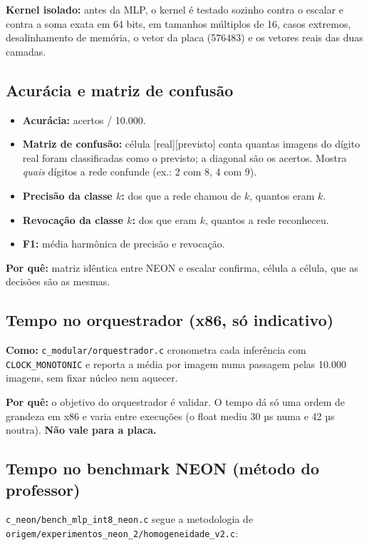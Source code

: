 \documentclass[10pt]{article}
\begin{document}
\textbf{Kernel isolado:} antes da MLP, o kernel é testado sozinho contra o escalar e contra a soma
exata em 64 bits, em tamanhos múltiplos de 16, casos extremos, desalinhamento de memória, o vetor
da placa (576483) e os vetores reais das duas camadas.

\subsection{Acurácia e matriz de confusão}
\begin{itemize}
\item \textbf{Acurácia:} acertos / 10.000.
\item \textbf{Matriz de confusão:} célula [real][previsto] conta quantas imagens do dígito real foram
      classificadas como o previsto; a diagonal são os acertos. Mostra \emph{quais} dígitos a rede
      confunde (ex.: 2 com 8, 4 com 9).
\item \textbf{Precisão da classe $k$:} dos que a rede chamou de $k$, quantos eram $k$.
\item \textbf{Revocação da classe $k$:} dos que eram $k$, quantos a rede reconheceu.
\item \textbf{F1:} média harmônica de precisão e revocação.
\end{itemize}
\textbf{Por quê:} matriz idêntica entre NEON e escalar confirma, célula a célula, que as decisões
são as mesmas.

\subsection{Tempo no orquestrador (x86, só indicativo)}
\textbf{Como:} \nolinkurl{c_modular/orquestrador.c} cronometra cada inferência com
\texttt{CLOCK\_MONOTONIC} e reporta a média por imagem numa passagem pelas 10.000 imagens, sem
fixar núcleo nem aquecer.

\textbf{Por quê:} o objetivo do orquestrador é validar. O tempo dá só uma ordem de grandeza em x86 e
varia entre execuções (o float mediu 30 µs numa e 42 µs noutra). \textbf{Não vale para a placa.}

\subsection{Tempo no benchmark NEON (método do professor)}
\nolinkurl{c_neon/bench_mlp_int8_neon.c} segue a metodologia de
\nolinkurl{origem/experimentos_neon_2/homogeneidade_v2.c}:
\end{document}

